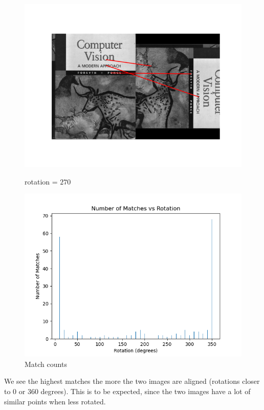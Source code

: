 \begin{problem}
\begin{figure}[H]
\begin{minipage}{0.49\textwidth}
      \includegraphics[width=\textwidth]{images/matches-270.png}
      \caption{rotation = $270$}
      \label{fig:matches-270}
    \end{minipage}
    \begin{minipage}{0.49\textwidth}
      \includegraphics[width=\textwidth]{images/rotation_test.png}
      \caption{Match counts}
      \label{fig:match-counts}
    \end{minipage}
  \end{figure}
\end{problem}

We see the highest matches the more the two images are aligned
(rotations closer to $0$ or $360$ degrees).
This is to be expected, since the two images have a lot of similar
points when less rotated.

